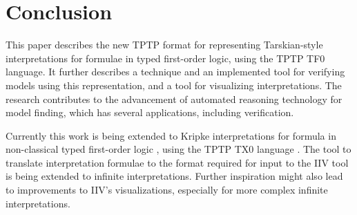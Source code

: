 \documentclass[letterpaper]{article}
\begin{document}
\section{Conclusion}
\label{Conclusion}

This paper describes the new TPTP format for representing Tarskian-style interpretations for
formulae in typed first-order logic, using the TPTP TF0 language.
It further describes a technique and an implemented tool for verifying models using this 
representation, and a tool for visualizing interpretations.
The research contributes to the advancement of automated reasoning technology for model finding, 
which has several applications, including verification.

Currently this work is being extended to Kripke interpretations for formula in non-classical 
typed first-order logic \cite{SF+22}, using the TPTP TX0 language \cite{Sut22-IGPL}.
The tool to translate interpretation formulae to the format required for input to the IIV tool is 
being extended to infinite interpretations.
Further inspiration might also lead to improvements to IIV's visualizations, especially for more
complex infinite interpretations.



\end{document}
